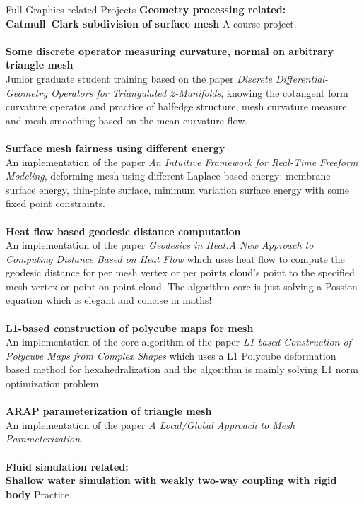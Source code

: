 \documentclass{resume} %
\begin{document}
\begin{rSection}{Full Graphics related Projects}
         \textbf{Geometry processing related:}\\
                {\bf Catmull–Clark subdivision of surface mesh} A course project.\\\\
                {\bf Some discrete operator measuring  curvature, normal on arbitrary triangle mesh}\\Junior graduate student training based on the paper \emph{Discrete Differential-Geometry Operators for Triangulated 2-Manifolds}, knowing the cotangent form curvature operator and practice of halfedge structure, mesh curvature measure and mesh smoothing based on the mean curvature flow.\\\\
                {\bf Surface mesh fairness using different energy}\\An implementation of the paper \emph{An Intuitive Framework for Real-Time Freeform Modeling}, deforming mesh using different Laplace based energy: membrane surface energy, thin-plate surface, minimum variation surface energy with some fixed point constraints.\\\\
                {\bf Heat flow based geodesic distance computation}\\An implementation of the paper \emph{Geodesics in Heat:A New Approach to Computing Distance Based on Heat Flow} which uses heat flow to compute the geodesic distance for per mesh vertex or per points cloud's point to the specified mesh vertex or point on point cloud. The algorithm core is just solving a Possion equation which is elegant and concise in maths!\\\\
                {\bf L1-based construction of polycube maps for mesh}\\  An implementation of the core algorithm of the paper \emph{L1-based Construction of Polycube Maps from Complex Shapes} which uses a L1 Polycube deformation based method for hexahedralization and the algorithm is mainly solving L1 norm optimization problem.\\\\
                {\bf ARAP parameterization of triangle mesh}\\An implementation of the paper \emph{A Local/Global Approach to Mesh Parameterization}.\\\\
         \textbf{Fluid simulation related:}\\
                {\bf Shallow water simulation with weakly two-way coupling with rigid body} Practice.\\\\

\end{rSection}
\end{document}
